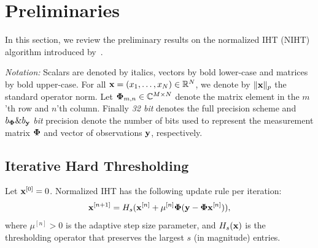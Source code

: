 \documentclass{article}
\begin{document}
\section{Preliminaries}\label{section_iht}

In this section, we review the preliminary results on the normalized IHT (NIHT) algorithm introduced by~\cite{blumensath2010niht, blumensath2012greedy}.

{\it Notation:} Scalars are denoted by italics, vectors by bold lower-case and matrices by bold upper-case. For all ${\bf x}= (x_1, \ldots, x_N) \in \mathbb{R}^N$, we denote by $\|{\bf x}\|_p$ the standard operator norm. Let ${\bf \Phi}_{m, n}\in \mathbb{C}^{M\times N}$ denote the matrix element in the $m$'th row and $n$'th column. Finally {\it 32 bit} denotes the full precision scheme and $b_{\bf \Phi}\&b_{\bf y}$ {\it bit} precision denote the number of bits used to represent the measurement matrix ${\bf \Phi}$ and vector of observations ${\bf y}$, respectively.
\subsection{Iterative Hard Thresholding} 
Let ${\bf x}^{[0]} = 0$. Normalized IHT has the following update rule per iteration: 
\begin{equation}\label{iht_update_rule}
{\bf x}^{[n+1]} = H_s({\bf x}^{[n]} + \mu^{[n]}{\bf \Phi}({\bf y}-{\bf \Phi}{\bf x}^{[n]})),
\end{equation}
where $\mu^{[n]}>0$ is the adaptive step size parameter, and $H_s({\bf x})$ is the
thresholding operator that preserves the largest $s$ (in magnitude) entries.



\end{document}
